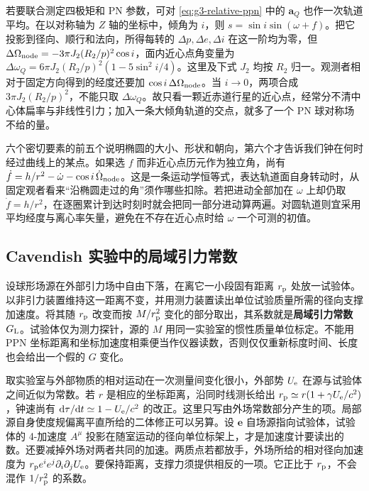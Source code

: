 若要联合测定四极矩和 PN 参数，可对 \eqref{eq:g3-relative-ppn} 中的 $\bm a_Q$ 也作一次轨道平均。在以对称轴为 $Z$ 轴的坐标中，倾角为 $i$，则 $s=\sin i\sin(\omega+f)$。把它投影到径向、顺行和法向，所得每转的 $\Delta p,\Delta e,\Delta i$ 在这一阶均为零，但 $\Delta\Omega_{\rm node}=-3\pi J_2(R_2/p)^2\cos i$，面内近心点角变量为 $\Delta\omega_Q=6\pi J_2(R_2/p)^2(1-5\sin^2i/4)$。这里及下式 $J_2$ 均按 $R_2$ 归一。观测者相对于固定方向得到的经度还要加 $\cos i\,\Delta\Omega_{\rm node}$。当 $i\to0$，两项合成 $3\pi J_2(R_2/p)^2$，不能只取 $\Delta\omega_Q$。故只看一颗近赤道行星的近心点，经常分不清中心体扁率与非线性引力；加入一条大倾角轨道的交点，就多了一个 PN 球对称场不给的量。

六个密切要素的前五个说明椭圆的大小、形状和朝向，第六个才告诉我们钟在何时经过曲线上的某点。如果选 $f$ 而非近心点历元作为独立角，尚有 $\dot f=h/r^2-\dot\omega-\cos i\,\dot\Omega_{\rm node}$。这是一条运动学恒等式，表达轨道面自身转动时，从固定观者看来“沿椭圆走过的角”须作哪些扣除。若把进动全部加在 $\omega$ 上却仍取 $\dot f=h/r^2$，在逐圈累计到达时刻时就会把同一部分进动算两遍。对圆轨道则宜采用平均经度与离心率矢量，避免在不存在近心点时给 $\omega$ 一个可测的初值。

\subsection{Cavendish 实验中的局域引力常数}\label{sec:pn-local-g}

设球形场源在外部引力场中自由下落，在离它一小段固有距离 $r_{\rm p}$ 处放一试验体。以非引力装置维持这一距离不变，并用测力装置读出单位试验质量所需的径向支撑加速度。将其随 $r_{\rm p}$ 改变而按 $M/r_{\rm p}^2$ 变化的部分取出，其系数就是\textbf{局域引力常数} $G_{\rm L}$。试验体仅为测力探针，源的 $M$ 用同一实验室的惯性质量单位标定。不能用 PPN 坐标距离和坐标加速度相乘便当作仪器读数，否则仅仅重新标度时间、长度也会给出一个假的 $G$ 变化。

取实验室与外部物质的相对运动在一次测量间变化很小，外部势 $U_{\rm e}$ 在源与试验体之间近似为常数。若 $r$ 是相应的坐标距离，沿同时线测长给出 $r_{\rm p}\simeq r(1+\gamma U_{\rm e}/c^2)$，钟速尚有 $\dd\tau/\dd t\simeq1-U_{\rm e}/c^2$ 的改正。这里只写由外场常数部分产生的项。局部源自身使度规偏离平直所给的二体修正可以另算。设 $\bm e$ 自场源指向试验体，试验体的 4-加速度 $A^\mu$ 投影在随室运动的径向单位标架上，才是加速度计要读出的数。还要减掉外场对两者共同的加速。两质点若都放手，外场所给的相对径向加速度为 $r_{\rm p}e^ie^j\partial_i\partial_j U_{\rm e}$。要保持距离，支撑力须提供相反的一项。它正比于 $r_{\rm p}$，不会混作 $1/r_{\rm p}^2$ 的系数。

